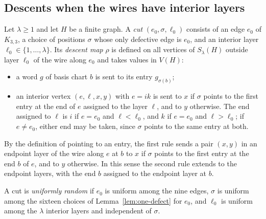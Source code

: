 \subsection{Descents when the wires have interior layers}\label{app:descent-interior}

Let $\lambda\ge1$ and let $H$ be a finite graph. A \emph{cut} $(e_0,\sigma,\ell_0)$ consists of an edge $e_0$ of $K_{3,3}$, a choice of positions $\sigma$ whose only defective edge is $e_0$, and an interior layer $\ell_0\in\{1,\ldots,\lambda\}$. Its \emph{descent map} $\rho$ is defined on all vertices of $S_\lambda(H)$ outside layer $\ell_0$ of the wire along $e_0$ and takes values in $V(H)$:
\begin{itemize}
\item a word $g$ of basis chart $b$ is sent to its entry $g_{\sigma(b)}$;
\item an interior vertex $(e,\ell,x,y)$ with $e=ik$ is sent to $x$ if $\sigma$ points to the first entry at the end of $e$ assigned to the layer $\ell$, and to $y$ otherwise. The end assigned to $\ell$ is $i$ if $e=e_0$ and $\ell<\ell_0$, and $k$ if $e=e_0$ and $\ell>\ell_0$; if $e\ne e_0$, either end may be taken, since $\sigma$ points to the same entry at both.
\end{itemize}
By the definition of pointing to an entry, the first rule sends a pair $(x,y)$ in an endpoint layer of the wire along $e$ at $b$ to $x$ if $\sigma$ points to the first entry at the end $b$ of $e$, and to $y$ otherwise. In this sense the second rule extends to the endpoint layers, with the end $b$ assigned to the endpoint layer at $b$.

A cut is \emph{uniformly random} if $e_0$ is uniform among the nine edges, $\sigma$ is uniform among the sixteen choices of Lemma~\ref{lem:one-defect} for $e_0$, and $\ell_0$ is uniform among the $\lambda$ interior layers and independent of $\sigma$.

